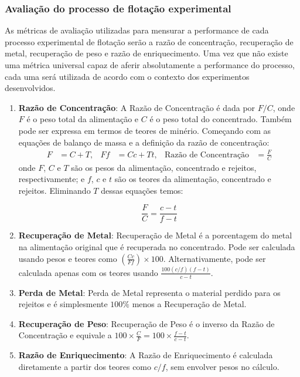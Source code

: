 \documentclass[12pt]{article}
\begin{document}
\subsubsection{Avaliação do processo de flotação experimental}
As métricas de avaliação utilizadas para mensurar a performance de cada processo experimental de flotação serão a razão de concentração, recuperação de metal, recuperação de peso e razão de enriquecimento. Uma vez que não existe uma métrica universal capaz de aferir absolutamente a performance do processo, cada uma será utilizada de acordo com o contexto dos experimentos desenvolvidos.\cite{kawatra2011fundamental}
\begin{enumerate}
\item \textbf{Razão de Concentração}:
A Razão de Concentração é dada por $F/C$, onde $F$ é o peso total da alimentação e $C$ é o peso total do concentrado. Também pode ser expressa em termos de teores de minério. Começando com as equações de balanço de massa e a definição da razão de concentração:
\begin{align*}
F &= C + T, & Ff &= Cc + Tt, & \text{Razão de Concentração} &= \frac{F}{C}
\end{align*}
onde $F$, $C$ e $T$ são os pesos da alimentação, concentrado e rejeitos, respectivamente; e $f$, $c$ e $t$ são os teores da alimentação, concentrado e rejeitos. Eliminando $T$ dessas equações temos:

\begin{equation}
\frac{F}{C} = \frac{c - t}{f - t}
\end{equation}

\item \textbf{Recuperação de Metal}:
Recuperação de Metal é a porcentagem do metal na alimentação original que é recuperada no concentrado. Pode ser calculada usando pesos e teores como $\left(\frac{Cc}{Ff}\right) \times 100$. Alternativamente, pode ser calculada apenas com os teores usando $\frac{100(c/f)(f - t)}{c - t}$.

\item \textbf{Perda de Metal}:
Perda de Metal representa o material perdido para os rejeitos e é simplesmente $100 \%$ menos a Recuperação de Metal.

\item \textbf{Recuperação de Peso}:
Recuperação de Peso é o inverso da Razão de Concentração e equivale a $100 \times \frac{C}{F} = 100 \times \frac{f - t}{c - t}$.

\item \textbf{Razão de Enriquecimento}:
A Razão de Enriquecimento é calculada diretamente a partir dos teores como $c/f$, sem envolver pesos no cálculo.
\end{enumerate}
\end{document}
